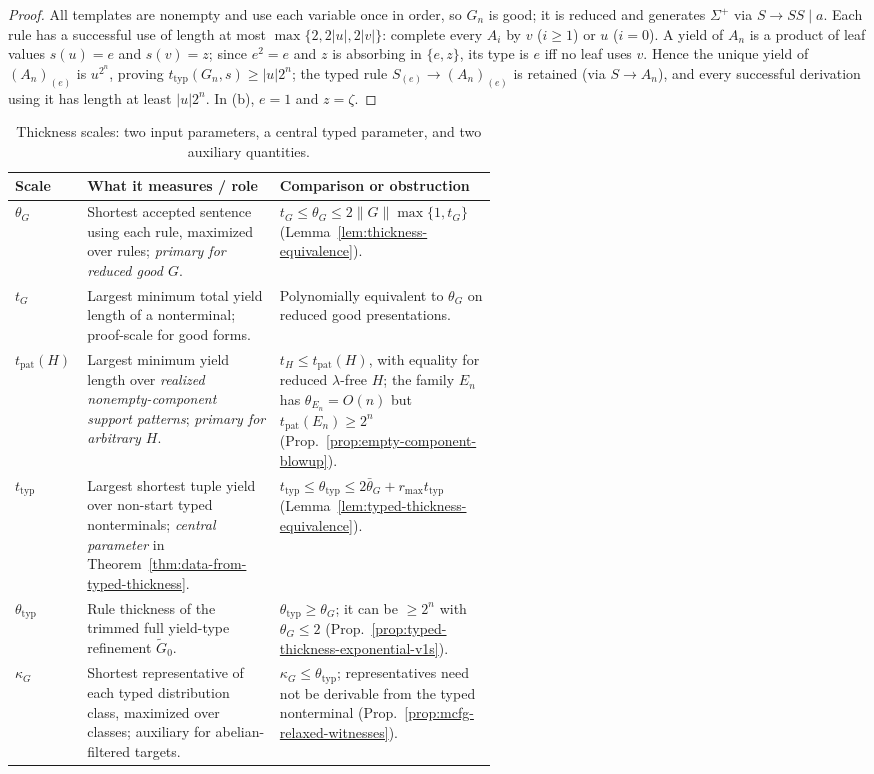 \documentclass[11pt]{article}
\numberwithin{equation}{section}
\theoremstyle{plain}
\theoremstyle{definition}
\theoremstyle{remark}
\theoremstyle{plain}
\begin{document}
\begin{proof}
All templates are nonempty and use each variable once in order, so $G_n$ is
good; it is reduced and generates $\Sigma^+$ via $S\to SS\mid a$.  Each rule has a
successful use of length at most $\max\{2,2|u|,2|v|\}$: complete every $A_i$ by
$v$ ($i\ge1$) or $u$ ($i=0$).  A yield of $A_n$ is a product of leaf values
$s(u)=e$ and $s(v)=z$; since $e^2=e$ and $z$ is absorbing in $\{e,z\}$, its type is
$e$ iff no leaf uses $v$.  Hence the unique yield of $(A_n)_{(e)}$ is
$u^{2^n}$, proving $t_{\mathrm{typ}}(G_n,s)\ge|u|2^n$; the typed rule $S_{(e)}\to(A_n)_{(e)}$ is retained (via
$S\to A_n$), and every successful derivation using it has length at least
$|u|2^n$.  In (b), $e=1$ and $z=\zeta$.
\end{proof}

\begin{table}[htbp]
\caption{Thickness scales: two input parameters, a central typed parameter, and two auxiliary quantities.}
\label{tab:thickness-scales}
\centering
\footnotesize
\setlength{\tabcolsep}{3.5pt}
\renewcommand{\arraystretch}{1.18}
\begin{tabularx}{\linewidth}{@{}p{0.155\linewidth}p{0.405\linewidth}X@{}}
\hline
Scale & What it measures / role & Comparison or obstruction\\
\hline
$\theta_G$ & Shortest accepted sentence using each rule, maximized over rules; \emph{primary for reduced good $G$}. & $t_G\le\theta_G\le 2\|G\|\max\{1,t_G\}$ (Lemma~\ref{lem:thickness-equivalence}).\\
$t_G$ & Largest minimum total yield length of a nonterminal; proof-scale for good forms. & Polynomially equivalent to $\theta_G$ on reduced good presentations.\\
$t_{\mathrm{pat}}(H)$ & Largest minimum yield length over \emph{realized nonempty-component support patterns}; \emph{primary for arbitrary $H$}. & $t_H\le t_{\mathrm{pat}}(H)$, with equality for reduced $\lambda$-free $H$; the family $E_n$ has $\theta_{E_n}=O(n)$ but $t_{\mathrm{pat}}(E_n)\ge2^n$ (Prop.~\ref{prop:empty-component-blowup}).\\
$t_{\mathrm{typ}}$ & Largest shortest tuple yield over non-start typed nonterminals; \emph{central parameter} in Theorem~\ref{thm:data-from-typed-thickness}. & $t_{\mathrm{typ}}\le\theta_{\mathrm{typ}}\le2\bar\theta_G+r_{\max}t_{\mathrm{typ}}$ (Lemma~\ref{lem:typed-thickness-equivalence}).\\
$\theta_{\mathrm{typ}}$ & Rule thickness of the trimmed full yield-type refinement $\widetilde G_0$. & $\theta_{\mathrm{typ}}\ge\theta_G$; it can be $\ge2^n$ with $\theta_G\le2$ (Prop.~\ref{prop:typed-thickness-exponential-v1s}).\\
$\kappa_G$ & Shortest representative of each typed distribution class, maximized over classes; auxiliary for abelian-filtered targets. & $\kappa_G\le\theta_{\mathrm{typ}}$; representatives need not be derivable from the typed nonterminal (Prop.~\ref{prop:mcfg-relaxed-witnesses}).\\
\hline
\end{tabularx}
\end{table}
\end{document}
